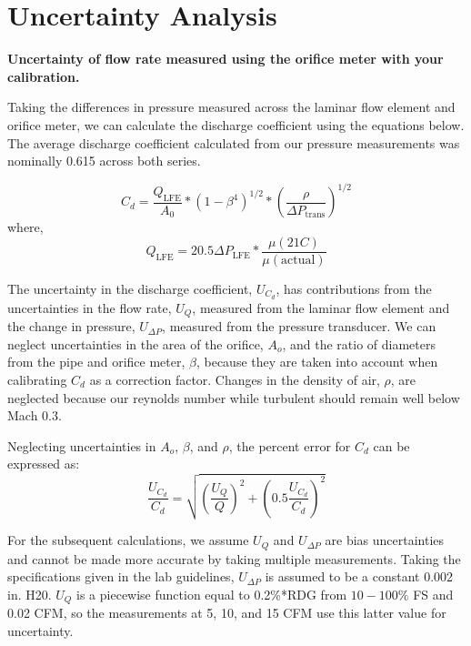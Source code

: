\documentclass{article}
\begin{document}
\newpage
\section{Uncertainty Analysis}

\textbf{Uncertainty of flow rate measured using the orifice meter with
your calibration.} 

Taking the differences in pressure measured across the laminar flow element and orifice meter, 
we can calculate the discharge coefficient using the equations below. The average discharge coefficient 
calculated from our pressure measurements was nominally 0.615 across both series.

\begin{equation}
  C_d = \frac{Q_{\text{LFE}} }{A_0} * (1-\beta^4)^{1/2} * \left(\frac{\rho}{\Delta P_{\text{trans}}}\right)^{1/2}
\end{equation}
where, 
\begin{equation}
  Q_{\text{LFE}} = 20.5 \Delta P_{\text{LFE}} * \frac{\mu(21 C)}{\mu(\text{actual})}
\end{equation}

The uncertainty in the discharge coefficient, $U_{C_d}$, has contributions from the uncertainties in
the flow rate, $U_Q$, measured from the laminar flow element and the change in pressure, $U_{\Delta P}$, 
measured from the pressure transducer. We can neglect uncertainties in the area of the orifice, $A_o$, 
and the ratio of diameters from the pipe and orifice meter, $\beta$, because they are taken into account 
when calibrating $C_d$ as a correction factor. Changes in the density of air, $\rho$, are neglected because our 
reynolds number while turbulent should remain well below Mach 0.3.

Neglecting uncertainties in $A_o$, $\beta$, and $\rho$, the percent error for $C_d$ can be expressed as:
\begin{equation}
  \frac{U_{C_d}}{C_d} = \sqrt{ \left(\frac{U_{Q}}{Q}\right)^2 + \left( 0.5 \frac{U_{C_d}}{C_d} \right)^2}
\end{equation}

For the subsequent calculations, we assume $U_Q$ and $U_{\Delta P}$ are bias uncertainties and cannot be 
made more accurate by taking multiple measurements. Taking the specifications given in the lab 
guidelines, $U_{\Delta P}$ is assumed to be a constant 0.002 in. H20. $U_Q$ is a piecewise function equal to 
0.2\%*RDG from $10-100\%$ FS and 0.02%
CFM, so the measurements at 5, 10, and 15 CFM use this latter value for uncertainty.
\end{document}

